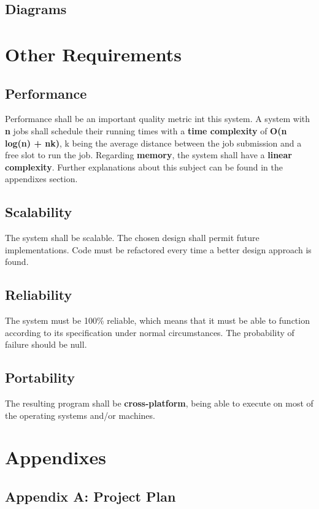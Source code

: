 \documentclass{scrreprt}
\begin{document}
\section{Diagrams}


\chapter{Other Requirements}

\section{Performance}

Performance shall be an important quality metric int this system. A system with \textbf{n} jobs shall schedule their running times with a \textbf{time complexity} of \textbf{O(n log(n) + nk)}, k being the average distance between the job submission and a free slot to run the job. Regarding \textbf{memory}, the system shall have a \textbf{linear complexity}. Further explanations about this subject can be found in the appendixes section.

\section{Scalability}
The system shall be scalable. The chosen design shall permit future implementations. Code must be refactored every time a better design approach is found.

\section{Reliability}

The system must be 100\% reliable, which means that it must be able to function according to its specification under normal circumstances. The probability of failure should be null.

\section{Portability}

The resulting program shall be \textbf{cross-platform}, being able to execute on most of the operating systems and/or machines.

\chapter{Appendixes}

\section{Appendix A: Project Plan}
\end{document}
